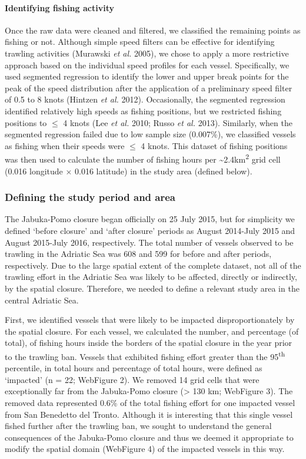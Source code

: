 \documentclass[11pt,]{article}
\let\oldparagraph\paragraph
\renewcommand{\paragraph}[1]{\oldparagraph{#1}\mbox{}}
\begin{document}
\paragraph{Identifying fishing
activity}\label{identifying-fishing-activity}

Once the raw data were cleaned and filtered, we classified the remaining
points as fishing or not. Although simple speed filters can be effective
for identifying trawling activities (Murawski \emph{et al.} 2005), we
chose to apply a more restrictive approach based on the individual speed
profiles for each vessel. Specifically, we used segmented regression to
identify the lower and upper break points for the peak of the speed
distribution after the application of a preliminary speed filter of 0.5
to 8 knots (Hintzen \emph{et al.} 2012). Occasionally, the segmented
regression identified relatively high speeds as fishing positions, but
we restricted fishing positions to \(\leq\) 4 knots (Lee \emph{et al.}
2010; Russo \emph{et al.} 2013). Similarly, when the segmented
regression failed due to low sample size (0.007\%), we classified
vessels as fishing when their speeds were \(\leq\) 4 knots. This dataset
of fishing positions was then used to calculate the number of fishing
hours per \textasciitilde{}2.4km\textsuperscript{2} grid cell (0.016
longitude × 0.016 latitude) in the study area (defined below).

\subsubsection{Defining the study period and
area}\label{defining-the-study-period-and-area}

The Jabuka-Pomo closure began officially on 25 July 2015, but for
simplicity we defined `before closure' and `after closure' periods as
August 2014-July 2015 and August 2015-July 2016, respectively. The total
number of vessels observed to be trawling in the Adriatic Sea was 608
and 599 for before and after periods, respectively. Due to the large
spatial extent of the complete dataset, not all of the trawling effort
in the Adriatic Sea was likely to be affected, directly or indirectly,
by the spatial closure. Therefore, we needed to define a relevant study
area in the central Adriatic Sea.

First, we identified vessels that were likely to be impacted
disproportionately by the spatial closure. For each vessel, we
calculated the number, and percentage (of total), of fishing hours
inside the borders of the spatial closure in the year prior to the
trawling ban. Vessels that exhibited fishing effort greater than the
95\textsuperscript{th} percentile, in total hours and percentage of
total hours, were defined as `impacted' (n = 22; WebFigure 2). We
removed 14 grid cells that were exceptionally far from the Jabuka-Pomo
closure (\textgreater{} 130 km; WebFigure 3). The removed data
represented 0.6\% of the total fishing effort for one impacted vessel
from San Benedetto del Tronto. Although it is interesting that this
single vessel fished further after the trawling ban, we sought to
understand the general consequences of the Jabuka-Pomo closure and thus
we deemed it appropriate to modify the spatial domain (WebFigure 4) of
the impacted vessels in this way.
\end{document}
